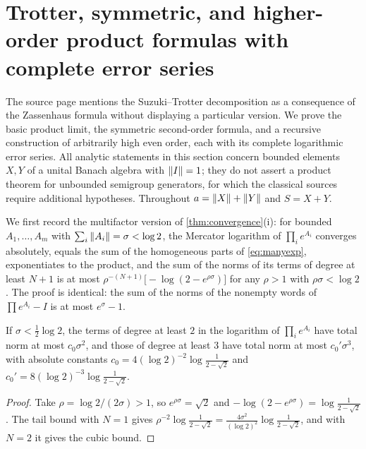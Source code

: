 \section{Trotter, symmetric, and higher-order product formulas with complete error series}\label{sec:splitting}
The source page mentions the Suzuki--Trotter decomposition as a consequence
of the Zassenhaus formula without displaying a particular version. We prove
the basic product limit, the symmetric second-order formula, and a
recursive construction of arbitrarily high even order, each with its
complete logarithmic error series. All analytic statements in this section
concern bounded elements $X,Y$ of a unital Banach algebra with $\left\lVert I\right\rVert=1$;
they do not assert a product theorem for unbounded semigroup generators,
for which the classical sources \cite{trotter} require additional
hypotheses. Throughout $a=\left\lVert X\right\rVert+\left\lVert Y\right\rVert$ and $S=X+Y$.

We first record the multifactor version of \cref{thm:convergence}(i):
for bounded $A_1,\ldots,A_m$ with $\sum_i\left\lVert A_i\right\rVert=\sigma<\log2$, the
Mercator logarithm of $\prod_ie^{A_i}$ converges absolutely, equals the
sum of the homogeneous parts of \eqref{eq:manyexp}, exponentiates to the
product, and the sum of the norms of its terms of degree at least $N+1$ is
at most $\rho^{-(N+1)}\bigl[-\log(2-e^{\rho\sigma})\bigr]$ for any
$\rho>1$ with $\rho\sigma<\log2$. The proof is identical: the sum of the
norms of the nonempty words of $\prod e^{A_i}-I$ is at most $e^{\sigma}-1$.

\begin{lemma}\label{lem:tail}
If $\sigma<\tfrac12\log2$, the terms of degree at least $2$ in the
logarithm of $\prod_ie^{A_i}$ have total norm at most $c_0\sigma^2$, and
those of degree at least $3$ have total norm at most $c_0'\sigma^3$, with
absolute constants $c_0=4(\log2)^{-2}\log\frac1{2-\sqrt2}$ and
$c_0'=8(\log2)^{-3}\log\frac1{2-\sqrt2}$.
\end{lemma}
\begin{proof}
Take $\rho=\log2/(2\sigma)>1$, so $e^{\rho\sigma}=\sqrt2$ and
$-\log(2-e^{\rho\sigma})=\log\frac1{2-\sqrt2}$. The tail bound with $N=1$
gives $\rho^{-2}\log\frac1{2-\sqrt2}=\frac{4\sigma^2}{(\log2)^2}\log\frac1{2-\sqrt2}$,
and with $N=2$ it gives the cubic bound.
\end{proof}

